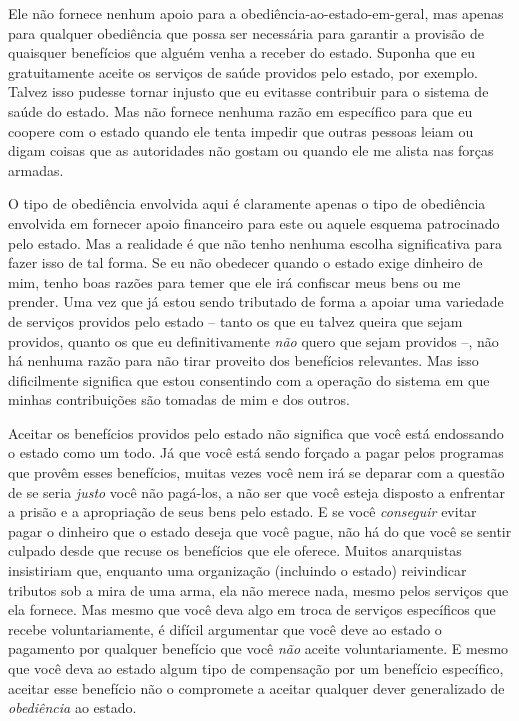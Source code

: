 Ele não fornece nenhum apoio para a obediência-ao-estado-em-geral, mas apenas para qualquer obediência que possa ser necessária para garantir a provisão de quaisquer benefícios que alguém venha a receber do estado. Suponha que eu gratuitamente aceite os serviços de saúde providos pelo estado, por exemplo. Talvez isso pudesse tornar injusto que eu evitasse contribuir para o sistema de saúde do estado. Mas não fornece nenhuma razão em específico para que eu coopere com o estado quando ele tenta impedir que outras pessoas leiam ou digam coisas que as autoridades não gostam ou quando ele me alista nas forças armadas.

O tipo de obediência envolvida aqui é claramente apenas o tipo de obediência envolvida em fornecer apoio financeiro para este ou aquele esquema patrocinado pelo estado. Mas a realidade é que não tenho nenhuma escolha significativa para fazer isso de tal forma. Se eu não obedecer quando o estado exige dinheiro de mim, tenho boas razões para temer que ele irá confiscar meus bens ou me prender. Uma vez que já estou sendo tributado de forma a apoiar uma variedade de serviços providos pelo estado -- tanto os que eu talvez queira que sejam providos, quanto os que eu definitivamente \emph{não} quero que sejam providos --, não há nenhuma razão para não tirar proveito dos benefícios relevantes. Mas isso dificilmente significa que estou consentindo com a operação do sistema em que minhas contribuições são tomadas de mim e dos outros.

Aceitar os benefícios providos pelo estado não significa que você está endossando o estado como um todo. Já que você está sendo forçado a pagar pelos programas que provêm esses benefícios, muitas vezes você nem irá se deparar com a questão de se seria \emph{justo} você não pagá-los, a não ser que você esteja disposto a enfrentar a prisão e a apropriação de seus bens pelo estado. E se você \emph{conseguir} evitar pagar o dinheiro que o estado deseja que você pague, não há do que você se sentir culpado desde que recuse os benefícios que ele oferece. Muitos anarquistas insistiriam que, enquanto uma organização (incluindo o estado) reivindicar tributos sob a mira de uma arma, ela não merece nada, mesmo pelos serviços que ela fornece. Mas mesmo que você deva algo em troca de serviços específicos que recebe voluntariamente, é difícil argumentar que você deve ao estado o pagamento por qualquer benefício que você \emph{não} aceite voluntariamente. E mesmo que você deva ao estado algum tipo de compensação por um benefício específico, aceitar esse benefício não o compromete a aceitar qualquer dever generalizado de \emph{obediência} ao estado.

